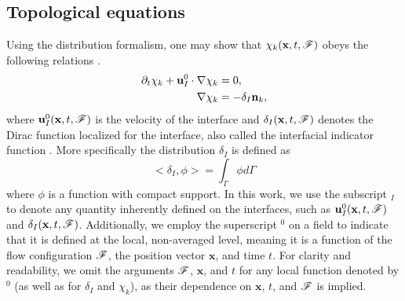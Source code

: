 
\subsection{Topological equations}
Using the distribution formalism, one may show that $\chi_k(\textbf{x},t,\mathscr{F})$ obeys the following relations \citep{drew1983mathematical}. 
\begin{align}
    \partial_t \chi_k
    + \textbf{u}_I^0 \cdot \mathbf{\nabla} \chi_k
    &= 0,
    \label{eq:dt_chi_k}\\
    \label{eq:grad_chi_k}
    \mathbf{\nabla} \chi_k
    &= - \delta_I \textbf{n}_k, 
\end{align}
where $\textbf{u}^0_I(\textbf{x},t,\mathscr{F})$ is the velocity of the interface and $\delta_I(\textbf{x},t,\mathscr{F})$ denotes the Dirac function localized for the interface, also called the interfacial indicator function \citep{drew1983mathematical,junqua2003}. More specifically the distribution $\delta_I$ is defined as \citep{appel2007}
\begin{equation}
<\delta_I,\phi> =\int_{\Gamma} \phi d\Gamma 
\end{equation}  
where $\phi$ is a function with compact support. %
In this work, we use the subscript $_I$ to denote any quantity inherently defined on the interfaces, such as $\textbf{u}_I^0(\textbf{x}, t, \mathscr{F})$ and $\delta_I(\textbf{x}, t, \mathscr{F})$. Additionally, we employ the superscript $^0$ on a field to indicate that it is defined at the local, non-averaged level, meaning it is a function of the flow configuration $\mathscr{F}$, the position vector $\textbf{x}$, and time $t$. For clarity and readability, we omit the arguments $\mathscr{F}$, $\textbf{x}$, and $t$ for any local function denoted by $^0$ (as well as for $\delta_I$ and $\chi_k$), as their dependence on $\textbf{x}$, $t$, and $\mathscr{F}$ is implied.

